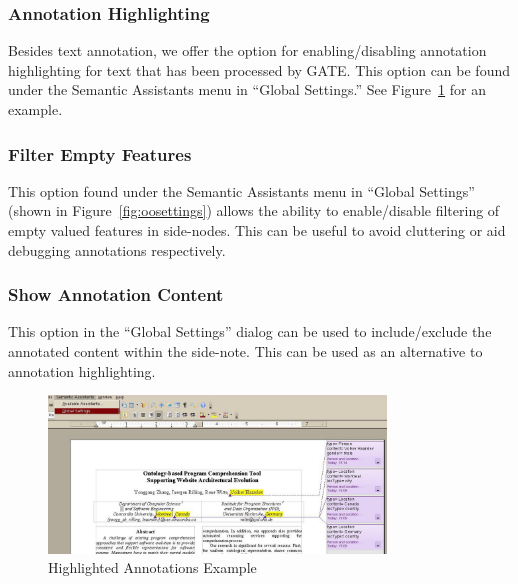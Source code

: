 \subsubsection{Annotation Highlighting}
Besides text annotation, we offer the option for enabling/disabling annotation
highlighting for text that has been processed by GATE. This option can be
found under the Semantic Assistants menu in ``Global Settings.''  See
Figure~\ref{fig:highlight} for an example.

\subsubsection{Filter Empty Features}
This option found under the Semantic Assistants menu in ``Global Settings'' (shown
in Figure~\ref{fig:oosettings}) allows the ability to enable/disable filtering of
empty valued features in side-nodes. This can be useful to avoid cluttering or aid
debugging annotations respectively.

\subsubsection{Show Annotation Content}
This option in the ``Global Settings'' dialog can be used to include/exclude
the annotated content within the side-note. This can be used as an alternative
to annotation highlighting.

\begin{figure}
  \centering
  \includegraphics[width=0.8\textwidth]{pictures/highlighting.jpg}
  \caption{Highlighted Annotations Example}
  \label{fig:highlight}
\end{figure}

